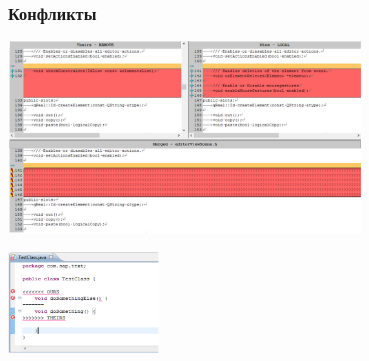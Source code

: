 \documentclass{../../slides-style}
\begin{document}
    \begin{frame}
        \frametitle{Конфликты}
        \begin{center}
            \includegraphics[width=0.7\textwidth]{conflicts.png}
        \end{center}
        \begin{center}
            \includegraphics[width=0.3\textwidth]{conflictsInCode.png}
        \end{center}
    \end{frame}
\end{document}
